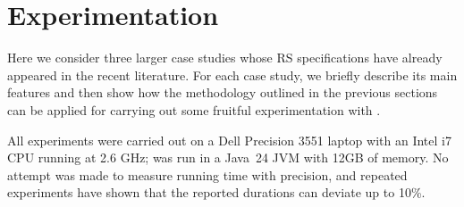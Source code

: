 
\section{Experimentation}\label{sec:experiments}

Here we consider 
three larger case studies whose RS specifications have already appeared in the recent literature. For each case study, we briefly describe its main features and then show how the methodology outlined in the previous sections can be applied for carrying out some fruitful experimentation with \GROOVE.

All \GROOVE experiments were carried out on a Dell Precision 3551 laptop with an Intel i7 CPU running at 2.6 GHz; \GROOVE was run in a Java~24 JVM with 12GB of memory. No attempt was made to measure running time with precision, and repeated experiments have shown that the reported durations can deviate up to 10\%.
